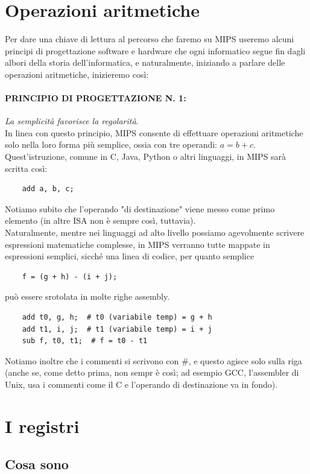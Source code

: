 \documentclass[class=book, crop=false]{standalone}
\begin{document}
\section{Operazioni aritmetiche}
Per dare una chiave di lettura al percorso che faremo su MIPS useremo alcuni principi di progettazione software e hardware che ogni informatico segue fin dagli albori della storia dell'informatica, e naturalmente, iniziando a parlare delle operazioni aritmetiche,  inizieremo così:

\paragraph{PRINCIPIO DI PROGETTAZIONE N. 1:}
\emph{La semplicità favorisce la regolarità}.\\

In linea con questo principio, MIPS consente di effettuare operazioni aritmetiche solo nella loro forma più semplice, ossia con tre operandi: \(a = b + c\).
Quest'istruzione, comune in C, Java, Python o altri linguaggi, in MIPS sarà scritta così:
\begin{verbatim}
	add a, b, c;
\end{verbatim}

Notiamo subito che l'operando "di destinazione" viene messo come primo elemento (in altre ISA non è sempre così, tuttavia).\\
Naturalmente, mentre nei linguaggi ad alto livello possiamo agevolmente scrivere espressioni matematiche complesse, in MIPS verranno tutte mappate in espressioni semplici, sicché una linea di codice, per quanto semplice
\begin{verbatim}
	f = (g + h) - (i + j);
\end{verbatim}
può essere srotolata in molte righe assembly.
\begin{verbatim}
	add t0, g, h;  # t0 (variabile temp) = g + h
	add t1, i, j;  # t1 (variabile temp) = i + j
	sub f, t0, t1;  # f = t0 - t1
\end{verbatim}
Notiamo inoltre che i commenti si scrivono con \#, e questo agisce solo sulla riga (anche se, come detto prima, non sempr è così; ad esempio GCC, l'assembler di Unix, usa i commenti come il C e l'operando di destinazione va in fondo).

\section{I registri}

\subsection{Cosa sono}
\end{document}
